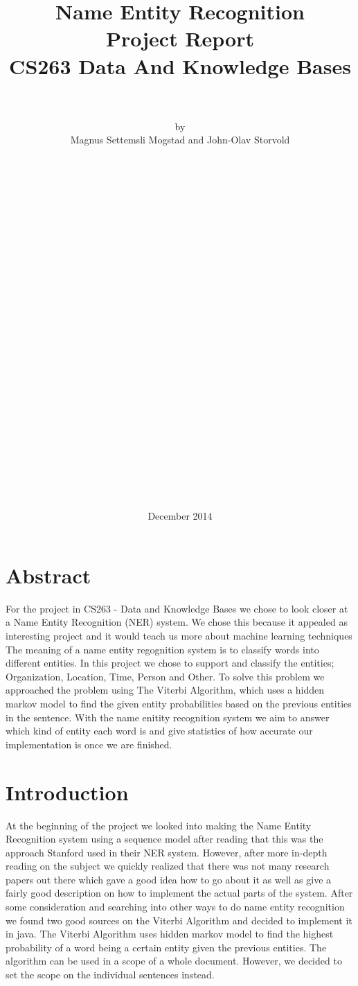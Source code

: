 \documentclass{article}
\title{Name Entity Recognition \\
    Project Report\\
    CS263 Data And Knowledge Bases\\\\}
\author{by\\ Magnus Settemsli Mogstad and John-Olav Storvold
\\\\\\\\\\\\\\\\\\\\\\\\\\\\\\\\\\\\\\\\\\\\\\\\\\\\\ }
\date{December 2014}
\begin{document}
\maketitle
\clearpage
\tableofcontents
\listoftables 
\clearpage

\section{Abstract}
For the project in CS263 - Data and Knowledge Bases we chose to look closer at a Name Entity Recognition (NER) system. We chose this because it appealed as interesting project and it would teach us more about machine learning techniques\\
The meaning of a name entity regognition system is to classify words into different entities. In this project we chose to support and classify the entities; Organization, Location, Time, Person and Other. To solve this problem we approached the problem using The Viterbi Algorithm, which uses a hidden markov model to find the given entity probabilities based on the previous entities in the sentence. With the name enitity recognition system we aim to answer which kind of entity each word is and give statistics of how accurate our implementation is once we are finished.

\section{Introduction}
At the beginning of the project we looked into making the Name Entity Recognition system using a sequence model after reading that this was the approach Stanford used in their NER system. However, after more in-depth reading on the subject we quickly realized that there was not many research papers out there which gave a good idea how to go about it as well as give a fairly good description on how to implement the actual parts of the system. After some consideration and searching into other ways to do name entity recognition we found two good sources on the Viterbi Algorithm and decided to implement it in java. The Viterbi Algorithm uses hidden markov model to find the highest probability of a word being a certain entity given the previous entities. The algorithm can be used in a scope of a whole document. However, we decided to set the scope on the individual sentences instead.
\end{document}
